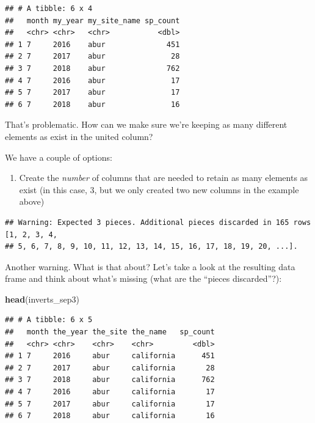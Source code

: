 \documentclass[]{book}
\newenvironment{Shaded}{\begin{snugshade}}{\end{snugshade}}
\newcommand{\DataTypeTok}[1]{\textcolor[rgb]{0.13,0.29,0.53}{#1}}
\newcommand{\KeywordTok}[1]{\textcolor[rgb]{0.13,0.29,0.53}{\textbf{#1}}}
\newcommand{\NormalTok}[1]{#1}
\newcommand{\OperatorTok}[1]{\textcolor[rgb]{0.81,0.36,0.00}{\textbf{#1}}}
\newcommand{\StringTok}[1]{\textcolor[rgb]{0.31,0.60,0.02}{#1}}
\providecommand{\tightlist}{%
  \setlength{\itemsep}{0pt}\setlength{\parskip}{0pt}}
\begin{document}
\begin{verbatim}
## # A tibble: 6 x 4
##   month my_year my_site_name sp_count
##   <chr> <chr>   <chr>           <dbl>
## 1 7     2016    abur              451
## 2 7     2017    abur               28
## 3 7     2018    abur              762
## 4 7     2016    abur               17
## 5 7     2017    abur               17
## 6 7     2018    abur               16
\end{verbatim}

That's problematic. How can we make sure we're keeping as many different elements as exist in the united column?

We have a couple of options:

\begin{enumerate}
\def\labelenumi{\arabic{enumi}.}
\tightlist
\item
  Create the \emph{number} of columns that are needed to retain as many elements as exist (in this case, 3, but we only created two new columns in the example above)
\end{enumerate}

\begin{Shaded}
\end{Shaded}

\begin{verbatim}
## Warning: Expected 3 pieces. Additional pieces discarded in 165 rows [1, 2, 3, 4,
## 5, 6, 7, 8, 9, 10, 11, 12, 13, 14, 15, 16, 17, 18, 19, 20, ...].
\end{verbatim}

Another warning. What is that about? Let's take a look at the resulting data frame and think about what's missing (what are the ``pieces discarded''?):

\begin{Shaded}
\begin{Highlighting}[]
\KeywordTok{head}\NormalTok{(inverts_sep3)}
\end{Highlighting}
\end{Shaded}

\begin{verbatim}
## # A tibble: 6 x 5
##   month the_year the_site the_name   sp_count
##   <chr> <chr>    <chr>    <chr>         <dbl>
## 1 7     2016     abur     california      451
## 2 7     2017     abur     california       28
## 3 7     2018     abur     california      762
## 4 7     2016     abur     california       17
## 5 7     2017     abur     california       17
## 6 7     2018     abur     california       16
\end{verbatim}
\end{document}
